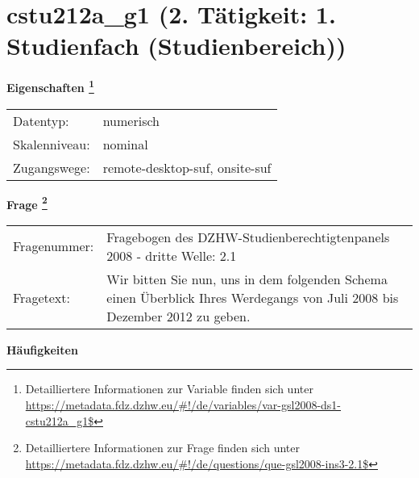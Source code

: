 
    \setcounter{footnote}{0}

    \vspace*{-1.8cm}
	\section{cstu212a\_g1 (2. Tätigkeit: 1. Studienfach (Studienbereich))}
	\label{section:cstu212a_g1}



    \vspace*{0.5cm}
    \noindent\textbf{Eigenschaften
	\footnote{Detailliertere Informationen zur Variable finden sich unter
		\url{https://metadata.fdz.dzhw.eu/\#!/de/variables/var-gsl2008-ds1-cstu212a_g1$}}}\\
	\begin{tabularx}{\hsize}{@{}lX}
	Datentyp: & numerisch \\
	Skalenniveau: & nominal \\
	Zugangswege: &
	  remote-desktop-suf, 
	  onsite-suf
 \\
    \end{tabularx}



				\vspace*{0.5cm}
                \noindent\textbf{Frage
	                \footnote{Detailliertere Informationen zur Frage finden sich unter
		              \url{https://metadata.fdz.dzhw.eu/\#!/de/questions/que-gsl2008-ins3-2.1$}}}\\
				\begin{tabularx}{\hsize}{@{}lX}
					Fragenummer: &
					  Fragebogen des DZHW-Studienberechtigtenpanels 2008 - dritte Welle:
					  2.1
 \\
					Fragetext: & Wir bitten Sie nun, uns in dem folgenden Schema einen Überblick Ihres Werdegangs von Juli 2008 bis Dezember 2012 zu geben. \\
				\end{tabularx}





        		\vspace*{0.5cm}
                \noindent\textbf{Häufigkeiten}

